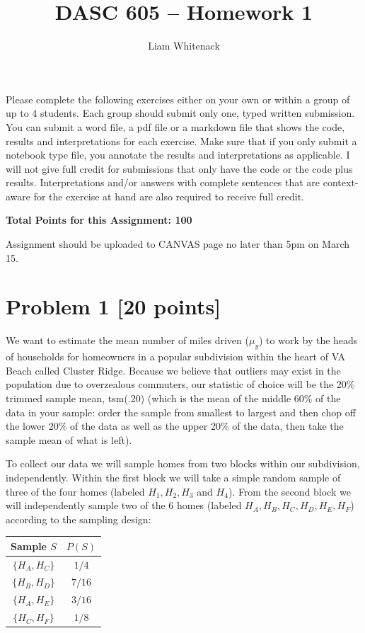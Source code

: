 \documentclass[12pt]{article}
\title{DASC 605 -- Homework 1}
\author{Liam Whitenack}
\date{}
\begin{document}
\maketitle

Please complete the following exercises either on your own or within a group of up to 4 students. Each group should submit only one, typed written submission. You can submit a word file, a pdf file or a markdown file that shows the code, results and interpretations for each exercise. Make sure that if you only submit a notebook type file, you annotate the results and interpretations as applicable. I will not give full credit for submissions that only have the code or the code plus results. Interpretations and/or answers with complete sentences that are context-aware for the exercise at hand are also required to receive full credit.

\bigskip

\textbf{Total Points for this Assignment: 100}

\bigskip

Assignment should be uploaded to CANVAS page no later than 5pm on March 15.

\section*{Problem 1 [20 points]}

We want to estimate the mean number of miles driven ($\mu_y$) to work by the heads of households for homeowners in a popular subdivision within the heart of VA Beach called Cluster Ridge. Because we believe that outliers may exist in the population due to overzealous commuters, our statistic of choice will be the 20\% trimmed sample mean, tsm(.20) (which is the mean of the middle 60\% of the data in your sample: order the sample from smallest to largest and then chop off the lower 20\% of the data as well as the upper 20\% of the data, then take the sample mean of what is left).

To collect our data we will sample homes from two blocks within our subdivision, independently. Within the first block we will take a simple random sample of three of the four homes (labeled $H_1, H_2, H_3$ and $H_4$). From the second block we will independently sample two of the 6 homes (labeled $H_A, H_B, H_C, H_D, H_E, H_F$) according to the sampling design:

\begin{center}
\begin{tabular}{cc}
\toprule
Sample $S$ & $P(S)$ \\
\midrule
$\{H_A,H_C\}$ & $1/4$ \\
$\{H_B,H_D\}$ & $7/16$ \\
$\{H_A,H_E\}$ & $3/16$ \\
$\{H_C,H_F\}$ & $1/8$ \\
\bottomrule
\end{tabular}
\end{center}
\end{document}
